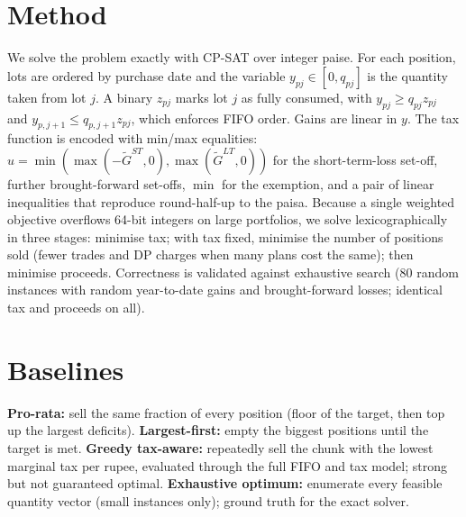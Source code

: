 \documentclass[11pt]{article}
\begin{document}
\section{Method}
We solve the problem exactly with CP-SAT over integer paise. For each position, lots are ordered by purchase date and the
variable $y_{pj}\in[0,q_{pj}]$ is the quantity taken from lot $j$. A binary $z_{pj}$ marks lot $j$ as fully consumed, with
$y_{pj}\ge q_{pj}z_{pj}$ and $y_{p,j+1}\le q_{p,j+1}z_{pj}$, which enforces FIFO order. Gains are linear in $y$.
The tax function is encoded with min/max equalities: $u=\min(\max(-\tilde G^{ST},0),\max(\tilde G^{LT},0))$ for the
short-term-loss set-off, further brought-forward set-offs, $\min$ for the exemption, and a pair of linear inequalities
that reproduce round-half-up to the paisa. Because a single weighted objective overflows 64-bit integers on large
portfolios, we solve lexicographically in three stages: minimise tax; with tax fixed, minimise the number of positions sold (fewer trades and DP charges when many plans cost the same); then minimise proceeds.
Correctness is validated against exhaustive search (80 random instances with random year-to-date gains and
brought-forward losses; identical tax and proceeds on all).

\section{Baselines}
\textbf{Pro-rata:} sell the same fraction of every position (floor of the target, then top up the largest deficits).
\textbf{Largest-first:} empty the biggest positions until the target is met.
\textbf{Greedy tax-aware:} repeatedly sell the chunk with the lowest marginal tax per rupee, evaluated through the full FIFO and tax model; strong but not guaranteed optimal.
\textbf{Exhaustive optimum:} enumerate every feasible quantity vector (small instances only); ground truth for the exact solver.
\end{document}
